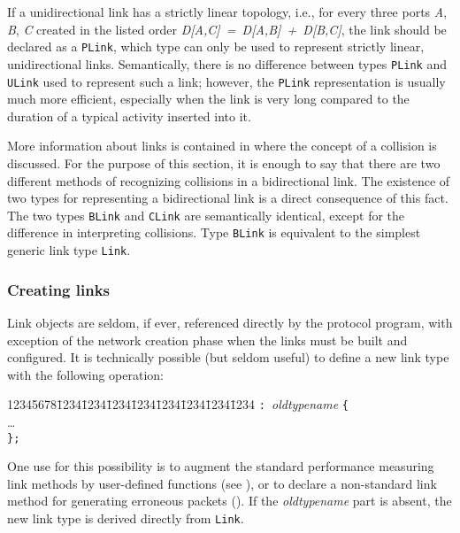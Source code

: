 If a unidirectional link has a strictly linear topology, i.e.,
for every three ports {\em A}, {\em B}, {\em C\/} created in the listed order
{\em D[A,C]~=~D[A,B]~+~D[B,C]},
the link should be declared as a {\tt PLink}, which type
can only be used to represent strictly linear, unidirectional links.
Semantically, there is no difference between types {\tt PLink} and {\tt ULink}
used to represent such a link; however, the {\tt PLink} representation is
usually much more efficient, especially when the link is very long
compared to the duration of a typical activity inserted into it.

More information about links is contained in  where
the concept of a collision is discussed.
For the purpose of this section, it is enough to say that there are two
different methods of recognizing collisions in a bidirectional
link.
The existence of two types for representing a bidirectional link is a
direct consequence of this fact.
The two types {\tt BLink} and {\tt CLink} are semantically identical,
except for the difference in interpreting collisions.
Type {\tt BLink} is equivalent to the simplest generic link type {\tt Link}.

\subsubsection{Creating links}
\label{rm_to_li_cr}

Link objects are seldom, if ever, referenced directly by the protocol
program, with exception of the network creation phase when the links must
be built and configured.
It is technically possible (but seldom useful)
to define a new link type with the following operation:
{\tt\begin{tabbing}
12345678\=1234\=1234\=1234\=1234\=1234\=1234\=1234\=1234\kill
{} {\tt : }{\em oldtypename\/} {\tt \{} \\
\> \>\ldots \\
\> {\tt \};}
\end{tabbing}}
One use for this possibility is to augment the standard
performance measuring link methods
by user-defined functions (see ), or to declare a
non-standard link method for generating erroneous packets
().
If the {\em oldtypename\/} part is absent,
the new link type is derived directly from {\tt Link}.

